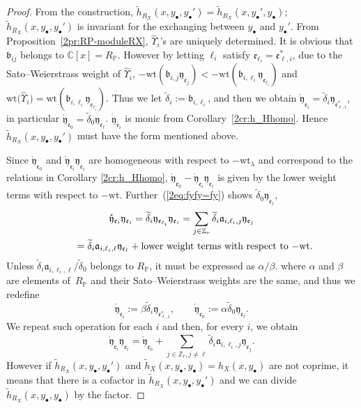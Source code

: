 \documentclass[10pt,a4paper]{amsart}
\def\CC{{\mathbb C}}
\def\ZZ{{\mathbb Z}}
\def\PP{{\mathbb P}}
\def\fa{{\mathfrak a}}
\def\fb{{\mathfrak b}}
\def\fe{{\mathfrak e}}
\def\fy{{\mathfrak y}}
\def\th{{\widetilde h}}
\def\tdelta{{\widetilde \delta}}
\def\hUpsilon{{\widehat \Upsilon}}
\def\rfy{{\mathring{\mathfrak y}}}
\def\wt{{\mathrm {wt}}}
\numberwithin{equation}{section}
\begin{document}
\begin{proof}From the construction, $\th_{R_X}(x, y_{\bullet}, y_{\bullet}')=\th_{R_X}(x, y_{\bullet}', y_{\bullet})$; $\th_{R_X}(x, y_{\bullet}, y_{\bullet}')$ is invariant for the exchanging between $y_{\bullet}$ and $y_{\bullet}'$.
From Proposition~\ref{2pr:RP-moduleRX}, $\hUpsilon_{i}$'s are uniquely determined.
It is obvious that $\fb_{i j}$ belongs to $\CC[x]=R_\PP$.
 However by letting $\ell_i$ satisfy
$\fe_{\ell_i}=\fe_{\ell,i}^*$, due to the Sato--Weierstrass weight of $\hUpsilon_{i}$, $-\wt(\fb_{i,j} \fy_{\fe_j}) < -\wt(\fb_{i,\ell_i} \fy_{\fe_{\ell_i}})$ and $\wt\big(\hUpsilon_{i}\big)=\wt(\fb_{i,\ell_i} \fy_{\fe_{\ell_i}})$.
Thus we let $\tdelta_i:=\fb_{i,\ell_i}$, and then we obtain $\rfy_{\fe_i}=\tdelta_i \fy_{\fe_{\ell,i}^*}$, in particular $\rfy_{\fe_0}=\tdelta_0 \fy_{\fe_\ell}$. $\rfy_{\fe_i}$ is monic from Corollary~\ref{2cr:h_Hhomo}.
Hence $\th_{R_X}(x, y_{\bullet}, y_{\bullet}')$ must have the form mentioned above.

Since $\rfy_{\fe_0}$ and $\rfy_{\fe_i}\fy_{\fe_i}$ are homogeneous with respect to $-\wt_\lambda$ and correspond to the relations in Corollary \ref{2cr:h_Hhomo}, $\rfy_{\fe_0}-\rfy_{\fe_i}\fy_{\fe_i}$ is given by the lower weight terms with respect to $-\wt$.
Further~(\ref{2eq:fyfy=fy}) shows $\tdelta_0 \fy_{\fe_\ell}$,
\begin{gather*}
\rfy_{\fe_i}\fy_{\fe_i} = \tdelta_i \fy_{\fe_{\ell_i}}\fy_{\fe_i}
=\sum_{j \in \ZZ_r} \tdelta_i \fa_{i, \ell_i, j}\fy_{\fe_j}\\
\hphantom{\rfy_{\fe_i}\fy_{\fe_i}}{} =\tdelta_i \fa_{i, \ell_i, \ell} \fy_{\fe_{\ell}} +\text{lower weight terms with respect to $-\wt$}.
\end{gather*}
Unless $\tdelta_i \fa_{i, \ell_i, \ell}/\tdelta_0$ belongs to $R_\PP$, it must be expressed as $\alpha/\beta$. where $\alpha$ and $\beta$ are elements of~$R_\PP$ and their Sato--Weierstrass weights are the same, and thus we redefine
\[
\rfy_{\fe_i}:=\beta \tdelta_i \fy_{\fe_{\ell,i}^*},
\qquad \rfy_{\fe_0}:=\alpha \tdelta_0 \fy_{\fe_\ell}.
\]
We repeat such operation for each $i$ and then, for every $i$, we obtain
\[
\rfy_{\fe_i}\fy_{\fe_i}
=\rfy_{\fe_0}+
\sum_{j \in \ZZ_r, j \neq \ell} \tdelta_i \fa_{i, \ell_i, j}\fy_{\fe_j}.
\]
However if $\th_{R_X}(x, y_{\bullet}, y_{\bullet}')$ and $\th_{X}(x, y_{\bullet}, y_{\bullet})=h_X(x, y_{\bullet})$ are not coprime, it means that there is a cofactor in $\th_{R_X}(x, y_{\bullet}, y_{\bullet}')$ and we can divide $\th_{R_X}(x, y_{\bullet}, y_{\bullet})$ by the factor.
\end{proof}
\end{document}
